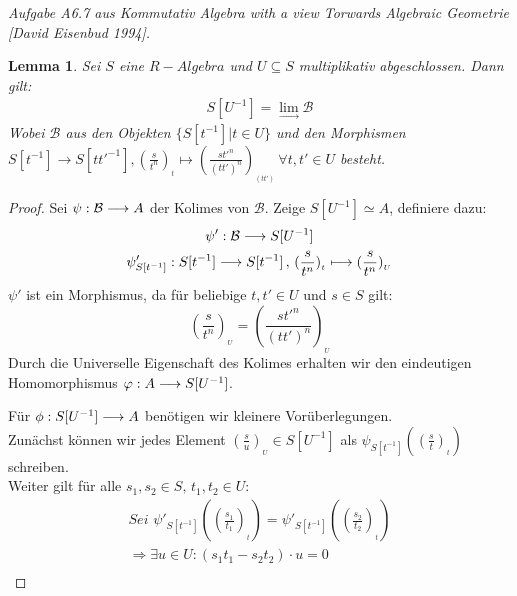 \documentclass[10pt,a4paper]{report}
\newcommand{\comment}[1]{}
\newcommand{\ModulsOfDifferenzials}{Kommutativ Algebra with a view Torwards Algebraic Geometrie [David Eisenbud 1994]}
\newcounter{Aussage}[chapter]
\newtheorem{lemma}[Aussage]{Lemma}
\newcommand{\functionfront}[3]{\nolinebreak{#1:#2 \longrightarrow #3}}
\newcommand{\function}[5]{\nolinebreak{#1:#2 \longrightarrow #3 \, , \, #4 \longmapsto #5}}
\newcommand{\lok}[2]{#1 [#2^{-1}]}
\newcommand{\loke}[3]{(\frac{#1}{#2})_{_{#3}}}
\newcommand{\colimes}[0]{\lim\limits_{ \longrightarrow }}
\begin{document}
\textit{Aufgabe A6.7 aus \ModulsOfDifferenzials.}
\begin{lemma}\label{Lokalisierung von Algebren als Kolimes}
Sei $S$ eine $R-Algebra$ und $U \subseteq S$ multiplikativ abgeschlossen.
Dann gilt:
\begin{gather*}
 S[U^{-1}] = \colimes \mathcal{B}
\end{gather*}
Wobei $\mathcal{B}$ aus den Objekten $\lbrace \lok{S}{t} \vert t \in U \rbrace$ und den Morphismen\\
$\lok{S}{t} \longrightarrow \lok{S}{tt'}, \loke{s}{t^n}{t} \longmapsto \loke{st'^n}{(tt')^n}{(tt')} \,
\forall t,t' \in U$ besteht.\\
\end{lemma}
\begin{proof}
Sei $\functionfront{\psi}{\mathcal{B}}{A}$ der Kolimes von $\mathcal{B}$. Zeige $\lok{S}{U} \simeq A$, definiere dazu:
\begin{gather*}
\functionfront{\psi'}{\mathcal{B}}{\lok{S}{U}}\\
\function{\psi'_{\lok{S}{t}}}{\lok{S}{t}}{\lok{S}{t}}{\loke{s}{t^n}{t}}{\loke{s}{t^n}{U}}
\end{gather*}
$\psi'$ ist ein Morphismus, da für beliebige $t,t' \in U$ und $s \in S$ gilt:
$$\loke{s}{t^n}{U} = \loke{st'^n}{(tt')^n}{U}$$
Durch die Universelle Eigenschaft des Kolimes erhalten wir den eindeutigen Homomorphismus $\functionfront{\varphi}{A}{\lok{S}{U}}$.
\begin{center}
\end{center}
Für $\functionfront{\phi}{S[U^{-1}]}{A}$ benötigen wir kleinere Vorüberlegungen.\\
Zunächst können wir jedes Element $\loke{s}{u}{U} \in \lok{S}{U}$ als $\psi_{\lok{S}{t}}(\loke{s}{t}{t})$ schreiben.\\
\comment{\label{wobei u = t}}
Weiter gilt für alle $s_1,s_2 \in S , \, t_1,t_2 \in U$: 
\begin{align*}
\textit{Sei }\psi'_{\lok{S}{t}}(\loke{s_1}{t_1}{t}) = \psi'_{\lok{S}{t}}(\loke{s_2}{t_2}{t})\\
\Rightarrow  \exists u \in U: (s_1t_1 - s_2t_2) \cdot u = 0\\

\end{align*}
\end{proof}
\end{document}
